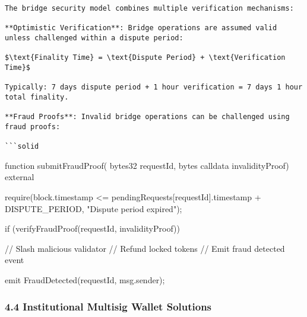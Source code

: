 \documentclass[12pt]{article}
\begin{document}
\begin{lstlisting}
The bridge security model combines multiple verification mechanisms:

**Optimistic Verification**: Bridge operations are assumed valid unless challenged within a dispute period:

$\text{Finality Time} = \text{Dispute Period} + \text{Verification Time}$

Typically: 7 days dispute period + 1 hour verification = 7 days 1 hour total finality.

**Fraud Proofs**: Invalid bridge operations can be challenged using fraud proofs:

```solid
\end{lstlisting}
function submitFraudProof(    bytes32 requestId,    bytes calldata invalidityProof) external {    require(block.timestamp <= pendingRequests[requestId].timestamp + DISPUTE_PERIOD, "Dispute period expired");

    if (verifyFraudProof(requestId, invalidityProof)) {        // Slash malicious validator        // Refund locked tokens        // Emit fraud detected event

        emit FraudDetected(requestId, msg.sender);    }}
\subsubsection{4.4 Institutional Multisig Wallet Solutions} %
\end{document}
